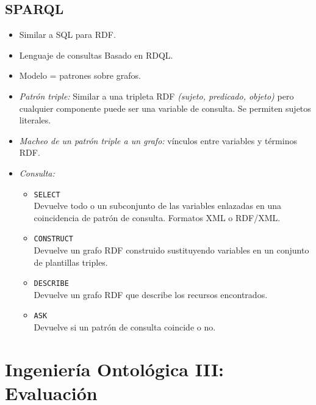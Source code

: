 \documentclass[a4paper,10pt,spanish,oneside]{article}
\begin{document}
\subsection{SPARQL}

\begin{itemize}
\item Similar a SQL para RDF.

\item Lenguaje de consultas Basado en RDQL.

\item Modelo = patrones sobre grafos.

\item \textit{Patrón triple:} Similar a una tripleta RDF \textit{(sujeto, predicado, objeto)} pero cualquier componente puede ser una variable de consulta. Se permiten sujetos literales.

\item \textit{Macheo de un patrón triple a un grafo:} vínculos entre variables y términos RDF.

\item \textit{Consulta:}

\begin{itemize}
\item \texttt{SELECT} \\ Devuelve todo o un subconjunto de las variables enlazadas en una coincidencia de patrón de consulta. Formatos XML o RDF/XML.

\item \texttt{CONSTRUCT} \\ Devuelve un grafo RDF construido sustituyendo variables en un conjunto de plantillas triples.

\item \texttt{DESCRIBE} \\ Devuelve un grafo RDF que describe los recursos encontrados.

\item \texttt{ASK} \\ Devuelve si un patrón de consulta coincide o no.
\end{itemize}

\end{itemize}

\section{Ingeniería Ontológica III: Evaluación}
\end{document}
